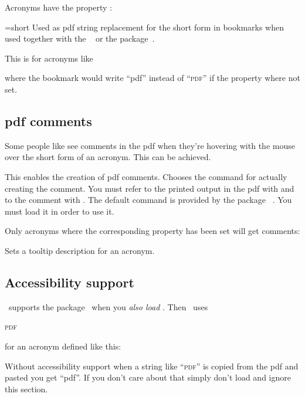 \documentclass{acro-manual}
\begin{document}
Acronyms have the property :
\begin{properties}
  \Default={short}
    Used as \acs{pdf} string replacement for the short form in bookmarks when
    used together with the ~\cite{pkg:hyperref} or the
     package~\cite{pkg:bookmark}.
\end{properties}

This is for acronyms like
\begin{sourcecode}
\end{sourcecode}
where the bookmark would write \enquote{pdf} instead of \enquote{\textsc{pdf}}
if the property where not set.

\subsection{\acs*{pdf} comments}\label{sec:pdf-comments}
Some people like see comments in the \ac{pdf} when they're hovering with the
mouse over the short form of an acronym.  This can be achieved.
\begin{options}
    This enables the creation of \ac{pdf} comments.
    Chooses the command for actually creating the comment.  You must refer to
    the printed output in the \ac{pdf} with  and to the comment with
    .  The default command  is provided by the
    package ~\cite{pkg:pdfcomment}.  You must load it in order
    to use it.
\end{options}
Only acronyms where the corresponding property has been set will get comments:  
\begin{properties}
    Sets a tooltip description for an acronym.
\end{properties}

\subsection{Accessibility support}\label{sec:access-supp}
\acro\ supports the  package~\cite{pkg:accsupp} when you
\emph{also load }.  Then \acro\ uses
\begin{sourcecode}
    \textsc{pdf}%
  \EndAccSupp{}%
\end{sourcecode}
for an acronym defined like this:
\begin{sourcecode}
\end{sourcecode}
Without accessibility support when a string like \enquote{\textsc{pdf}} is
copied from the \ac{pdf} and pasted you get \enquote{pdf}.  If you don't care
about that simply don't load  and ignore this section.
\end{document}
